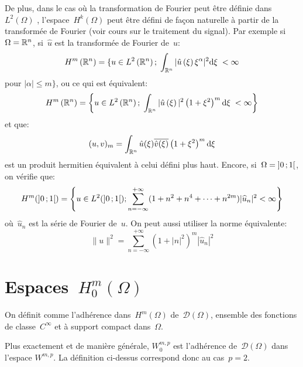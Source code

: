 \medskip{}
De plus, dans le cas où la transformation de Fourier peut être définie dans~$L^{2} ( \Omega)$ ,
l'espace~$H^k(\Omega)$ peut être défini de façon naturelle à partir de la transformée de Fourier
(voir cours sur le traitement du signal).
\medskipvm
Par exemple si~$\Omega = \mathbb R^{n}$, si~$\widehat{u}$ est la transformée de Fourier de~$u$:
\begin{equation}
H^{m}\left( \mathbb R ^{n}\right)=\lbrace u \in L^{2}\left( \mathbb R^{n}\right);\; \int_{\mathbb R^{n}}\vert\hat{u}\left( \xi\right) \xi^{\alpha}\vert ^{2}\text{d}\xi \;<\infty
\end{equation}
pour $\vert\alpha\vert \leqslant m \rbrace$, ou ce qui est équivalent:
\begin{equation}
H^{m}\left( \mathbb R ^{n}\right)=\left\lbrace u \in L^{2}\left( \mathbb R^{n}\right);\; \int_{\mathbb R^{n}}\vert\hat{u}\left( \xi\right) \vert ^{2}\left( 1+\xi^{2}\right)^{m} \text{d}\xi \;<\infty \right\rbrace
\end{equation}
et que:
\begin{equation}
(u,v)_{m}=\int_{\mathbb R^{n}}\hat{u}(\xi) \overline{\hat{v}(\xi)} \left(1 + \xi^{2} \right) ^{m} \text{d}\xi
\end{equation}
est un produit hermitien équivalent à celui défini plus haut. Encore, si~$\Omega =\mathopen{]}0\,;1\mathclose{[}$, on vérifie que:
\begin{equation}
H^m(\mathopen{]}0\,;1\mathclose{[}) = \left\{ u\in L^2(\mathopen{]}0\,;1\mathclose{[});\sum\limits_{n=-\infty}^{+\infty} (1+n^2 + n^4 + \dotsb + n^{2m}) |\widehat{u}_n|^2 < \infty \right\}
\end{equation}
où~$\widehat{u}_n$ est la série de Fourier de~$u$.
On peut aussi utiliser la norme équivalente:
\begin{equation}
\|u\|^2=\sum\limits_{n=-\infty}^{+\infty} (1 + |n|^{2})^m |\widehat{u}_n|^2
\end{equation}




\medskip
\section{Espaces~$H^m_0(\Omega)$}

\begin{definition}
On définit  comme l'adhérence dans~$H^m(\Omega)$
de~$\mathcal{D}(\Omega)$, ensemble des fonctions de classe~$C^\infty$ et à support compact
dans~$\Omega$.
\end{definition}
Plus exactement et de manière générale, $W^{m,p}_0$ est l'adhérence de~$\mathcal{D}(\Omega)$ dans l'espace
$W^{m,p}$. La définition ci-dessus correspond donc au cas~$p=2$.


